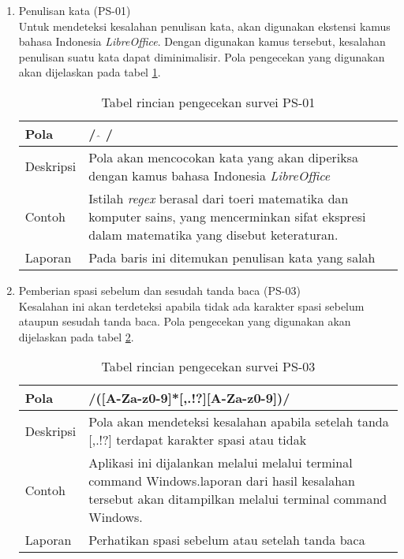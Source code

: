 \begin{enumerate}
	\item Penulisan kata (PS-01) \\
	Untuk mendeteksi kesalahan penulisan kata, akan digunakan ekstensi kamus bahasa Indonesia \textit{LibreOffice}. Dengan digunakan kamus tersebut, kesalahan penulisan suatu kata dapat diminimalisir. Pola pengecekan yang digunakan akan dijelaskan pada tabel \ref{tab:ps01}.
		
	\begin{table}[H]
		\renewcommand{\arraystretch}{1.5}
		\caption {Tabel rincian pengecekan survei PS-01} 
		\label{tab:ps01}
		\begin{center}
			\begin{tabular}{|p{3.5cm} |p{10.5cm}|}
			\hline 
			Pola & / $\hat{}$ / \\ 
			\hline 
			Deskripsi & Pola akan mencocokan kata yang akan diperiksa dengan kamus bahasa Indonesia \textit{LibreOffice} \\ 
			\hline 
			Contoh & Istilah \textit{regex} berasal dari toeri matematika dan komputer sains, yang mencerminkan sifat ekspresi dalam matematika yang disebut keteraturan. \\ 
			\hline 
			Laporan & Pada baris ini ditemukan penulisan kata yang salah \\ 
			\hline
			\end{tabular}
		\end{center}
	\end{table}
	
	\item Pemberian spasi sebelum dan sesudah tanda baca (PS-03) \\
	Kesalahan ini akan terdeteksi apabila tidak ada karakter spasi sebelum ataupun sesudah tanda baca. Pola pengecekan yang digunakan akan dijelaskan pada tabel \ref{tab:ps03}.
		
	\begin{table}[H]
		\renewcommand{\arraystretch}{1.5}
		\caption {Tabel rincian pengecekan survei PS-03} 
		\label{tab:ps03}
		\begin{center}
			\begin{tabular}{|p{3.5cm} |p{10.5cm}|}
			\hline 
			Pola & /([A-Za-z0-9]*[,.!?][A-Za-z0-9])/ \\ 
			\hline 
			Deskripsi & Pola akan mendeteksi kesalahan apabila setelah tanda [,.!?] terdapat karakter spasi atau tidak \\ 
			\hline 
			Contoh & Aplikasi ini dijalankan melalui melalui terminal command Windows.laporan dari hasil kesalahan tersebut akan ditampilkan melalui terminal command Windows. \\ 
			\hline 
			Laporan & Perhatikan spasi sebelum atau setelah tanda baca \\ 
			\hline
			\end{tabular}
		\end{center}
	\end{table}
	

\end{enumerate}
